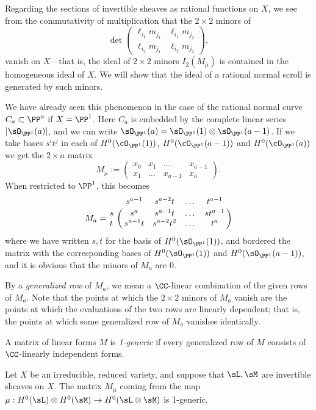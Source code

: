 Regarding the sections of invertible sheaves as rational functions on $X$, we see from the commutativity of
multiplication that the $2\times 2$ minors
of 
$$
\det \begin{pmatrix}
\ell_{i_1}m_{j_1} & \ell_{i_1}m_{j_2}\\
\ell_{i_2}m_{j_1} &\ell_{i_2}m_{j_2}  
\end{pmatrix},
$$
vanish on $X$---that is, the ideal of $2\times 2$ minors $I_2(M_\mu)$ is contained in the homogeneous ideal
of $X$. We will show that the ideal of a rational normal scroll is generated by such minors.

\begin{example}
 We have already seen this phenomenon in the case of the rational normal curve $C_a\subset \PP^a$ if $X = \PP^1$.
Here $C_{a}$ is embedded by the complete
linear series $|\sO_{\PP^1}(a)|$, and  we can write $\sO_{\PP^1}(a) = \sO_{\PP^1}(1)\otimes \sO_{\PP^1}(a-1)$.
If we take bases $s^it^j$ in each of $H^0(\cO_{\PP^1}(1))$,  $H^0(\cO_{\PP^1}(a-1))$ and $H^0(\cO_{\PP^1}(a))$ 
we get
the $2\times a$ matrix
$$
M_\mu := 
\begin{pmatrix}
x_0&x_1&\dots&x_{a-1}\\
x_1&\dots&x_{a-1}&x_a
\end{pmatrix}.
$$
When restricted to $\PP^1$, this becomes
$$
M_a = \bordermatrix{
& s^{a-1}&s^{a-2}t&\dots&t^{a-1}\cr
s&  s^{a}& s^{a-1}t&\dots&st^{a-1}\cr
t&  s^{a-1}t& s^{a-2}t^{2}&\dots&t^{a}\cr
}$$
where we have written $s,t$ for the basis of $H^0(\sO_{\PP^1}(1))$, and bordered the matrix
with the corresponding bases of $H^0(\sO_{\PP^1}(1))$ and $H^0(\sO_{\PP^1}(a-1))$, and it is obvious
that the minors of $M_a$ are 0.
\end{example}

By a \emph{generalized row} of $M_{a}$, we mean a $\CC$-linear combination of the given rows of $M_{a}$. Note that the points at which the $2\times 2$ minors of $M_{a}$ vanish are the points at which the evaluations of the two rows are linearly dependent; that is, the points at which some
generalized row of $M_{a}$ vanishes identically. 

\begin{definition}
 A matrix of linear forms $M$ is  \emph{1-generic} if every generalized row of $M$
 consists of $\CC$-linearly independent forms.
 \end{definition}
 
 \begin{proposition}\label{some generators}
Let $X$ be
an irreducible, reduced variety, and suppose that $\sL,\sM$ are invertible sheaves on $X$.
The matrix $M_\mu$ coming from the map $\mu:H^0(\sL) \otimes H^0(\sM) \to H^0(\sL\otimes \sM)$
is 1-generic.
\end{proposition}

